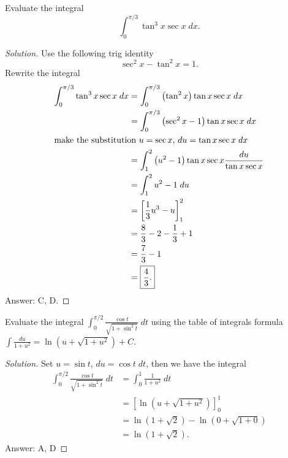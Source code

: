 \begin{problem}
Evaluate the integral
\[
\int_0^{\pi/3}\tan^3 x\sec x\;dx.
\]
\end{problem}
\begin{proof}[Solution]
Use the following trig identity
\[
\sec^2 x-\tan ^2x=1.
\]
Rewrite the integral
\begin{align*}
\int_0^{\pi/3}\tan^3 x\sec x\;dx
&=\int_0^{\pi/3}\left(\tan^2 x\right)\tan x\sec x\;dx\\
&=\int_0^{\pi/3}\left(\sec^2 x-1\right)\tan x\sec x\;dx\\
\intertext{make the substitution $u=\sec x$, $du =\tan x\sec x\;dx$}
&=\int_1^2\left(u^2-1\right)\tan x\sec x\frac{du}{\tan x\sec x}\\
&=\int_1^2 u^2-1\;du\\
&=\left[\frac{1}{3}u^3-u \right]_1^2\\
&=\frac{8}{3}-2-\frac{1}{3}+1\\
&=\frac{7}{3}-1\\
&=\boxed{\frac{4}{3}.}
\end{align*}
Answer: {\color{Red} C}, {\color{Green} D}.
\end{proof}

\begin{problem}
Evaluate the integral $\displaystyle\int_0^{\pi/2}\frac{\cos
  t}{\sqrt{1+\sin^2 t}}\;dt$ using the table of integrals formula
$\displaystyle\int \frac{du}{1+u^2}=\ln\left(u+\sqrt{1+u^2}\right)+C$.
\end{problem}
\begin{proof}[Solution]
Set $u=\sin t$, $du=\cos t\;dt$, then we have the integral
\begin{align*}
\int_0^{\pi/2}\frac{\cos t}{\sqrt{1+\sin^2 t}}\;dt
&=\int_0^1\frac{1}{1+u^2}\;dt\\
&=\left[\ln\left(u+\sqrt{1+u^2}\right)\right]_0^1\\
&=\ln\left(1+\sqrt{2}\right)-\ln \left(0+\sqrt{1+0}\right)\\
&=\boxed{\ln\left( 1+\sqrt{2} \right).}
\end{align*}
Answer: {\color{Red} A}, {\color{Green} D}
\end{proof}

